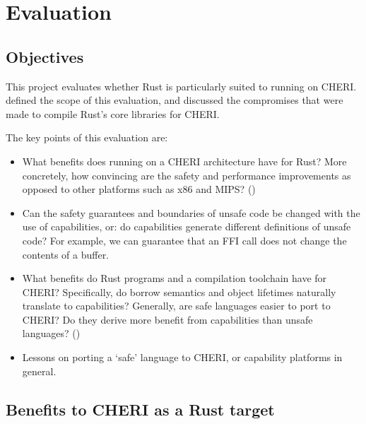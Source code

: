 \documentclass[dissertation.tex]{subfiles}
\begin{document}
\chapter{Evaluation}
\label{ch:eval}

\section{Objectives}
This project evaluates whether Rust is particularly suited to running on
CHERI.
 defined the scope of this evaluation, and
discussed the compromises that were made to compile Rust's core
libraries for CHERI.

The key points of this evaluation are:

\begin{itemize}
    \item What benefits does running on a CHERI architecture have for Rust?
    More concretely, how convincing are the safety and performance
    improvements as opposed to other platforms such as x86 and MIPS?
    ()
    \item Can the safety guarantees and boundaries of unsafe code be
    changed with the use of capabilities, or: do capabilities generate
    different definitions of unsafe code?
    For example, we can guarantee that an FFI call does not change the
    contents of a buffer.
    \item What benefits do Rust programs and a compilation toolchain
    have for CHERI?
    Specifically, do borrow semantics and object lifetimes naturally
    translate to capabilities?
    Generally, are safe languages easier to port to CHERI? Do they
    derive more benefit from capabilities than unsafe languages?
    ()
    \item Lessons on porting a `safe' language to CHERI, or capability
    platforms in general. 
\end{itemize}


\section{Benefits to CHERI as a Rust target}
\label{sec:eval-cheri}


\end{document}
